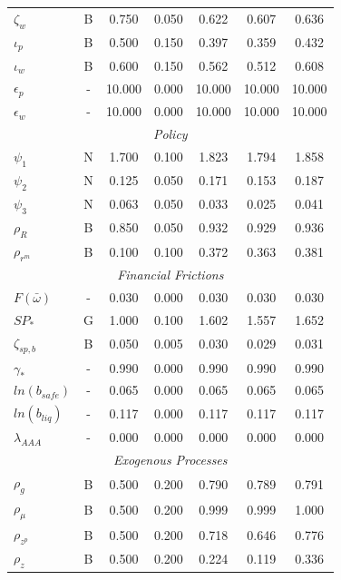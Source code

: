 \documentclass[12pt]{article}
\begin{document}
{\begin{longtable}{lcccccc}
$\zeta_w$ & B &    0.750 &    0.050 &    0.622 &    0.607 &    0.636 \\
$\iota_p$ & B &    0.500 &    0.150 &    0.397 &    0.359 &    0.432 \\
$\iota_w$ & B &    0.600 &    0.150 &    0.562 &    0.512 &    0.608 \\
$\epsilon_{p}$ & - &   10.000 &    0.000 &   10.000 &   10.000 &   10.000 \\
$\epsilon_{w}$ & - &   10.000 &    0.000 &   10.000 &   10.000 &   10.000 \\
\multicolumn{7}{c}{\textit{Policy}} \\[3pt]
$\psi_1$ & N &    1.700 &    0.100 &    1.823 &    1.794 &    1.858 \\
$\psi_2$ & N &    0.125 &    0.050 &    0.171 &    0.153 &    0.187 \\
$\psi_3$ & N &    0.063 &    0.050 &    0.033 &    0.025 &    0.041 \\
$\rho_R$ & B &    0.850 &    0.050 &    0.932 &    0.929 &    0.936 \\
$\rho_{r^m}$ & B &    0.100 &    0.100 &    0.372 &    0.363 &    0.381 \\
\multicolumn{7}{c}{\textit{Financial Frictions}} \\[3pt]
$F(\bar{\omega})$ & - &    0.030 &    0.000 &    0.030 &    0.030 &    0.030 \\
$SP_*$ & G &    1.000 &    0.100 &    1.602 &    1.557 &    1.652 \\
$\zeta_{sp,b}$ & B &    0.050 &    0.005 &    0.030 &    0.029 &    0.031 \\
$\gamma_*$ & - &    0.990 &    0.000 &    0.990 &    0.990 &    0.990 \\
$ln(b_{safe})$ & - &    0.065 &    0.000 &    0.065 &    0.065 &    0.065 \\
$ln(b_{liq})$ & - &    0.117 &    0.000 &    0.117 &    0.117 &    0.117 \\
$\lambda_{AAA}$ & - &    0.000 &    0.000 &    0.000 &    0.000 &    0.000 \\
\multicolumn{7}{c}{\textit{Exogenous Processes}} \\[3pt]
$\rho_g$ & B &    0.500 &    0.200 &    0.790 &    0.789 &    0.791 \\
$\rho_{\mu}$ & B &    0.500 &    0.200 &    0.999 &    0.999 &    1.000 \\
$\rho_{z^p}$ & B &    0.500 &    0.200 &    0.718 &    0.646 &    0.776 \\
$\rho_z$ & B &    0.500 &    0.200 &    0.224 &    0.119 &    0.336 \\

\end{longtable}}
\end{document}
